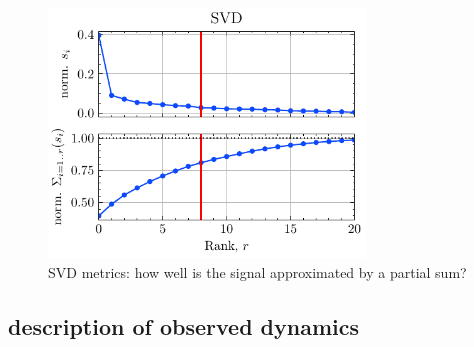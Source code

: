 \begin{figure}
	\centering
	\includegraphics[width=0.75\textwidth]{figures/chap4/OD_df_125Hz_Delay1-6_SVD_qual.pdf}
	\caption{SVD metrics: how well is the signal approximated by a partial sum?}
	\label{fig:OD_df_125Hz_Delay1-6_SVD_qual}
\end{figure}

\subsection{description of observed dynamics}